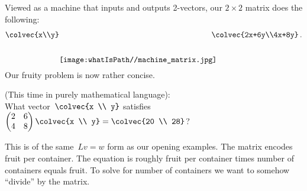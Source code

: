 Viewed as a machine that inputs and outputs 2-vectors, our $2\times2$ matrix does the following:
\[
\colvec{x\\y}\raisebox{-11mm}{\texttt{[image: \\whatIsPath//machine\_matrix.jpg]} }\!\!\!\!\!\!\colvec{2x+6y\\4x+8y}\, .
\]
Our fruity problem is now rather concise.
\begin{example}  (This time in purely mathematical language): \\[.2cm]
What vector~$  \colvec{x \\ y}$ satisfies 
$
    \begin{pmatrix}
      2     & 6 \\
      4     & 8
    \end{pmatrix}
  \colvec{x \\ y}
  =   \colvec{20 \\ 28}
$?
\end{example}
This is of the same~$Lv=w$ form as our opening examples. 
The matrix encodes fruit per container. The equation is roughly fruit per container times number of containers equals fruit. To solve for number of containers we want to \hypertarget{ch1divide}{somehow ``divide''} by the matrix. 



